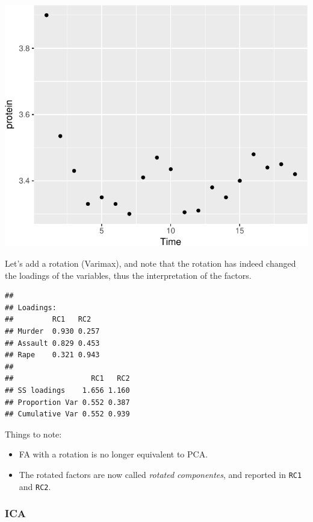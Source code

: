 \documentclass[]{book}
\newenvironment{Shaded}{\begin{snugshade}}{\end{snugshade}}
\newcommand{\DataTypeTok}[1]{\textcolor[rgb]{0.13,0.29,0.53}{#1}}
\newcommand{\DecValTok}[1]{\textcolor[rgb]{0.00,0.00,0.81}{#1}}
\newcommand{\FloatTok}[1]{\textcolor[rgb]{0.00,0.00,0.81}{#1}}
\newcommand{\KeywordTok}[1]{\textcolor[rgb]{0.13,0.29,0.53}{\textbf{#1}}}
\newcommand{\NormalTok}[1]{#1}
\newcommand{\OperatorTok}[1]{\textcolor[rgb]{0.81,0.36,0.00}{\textbf{#1}}}
\newcommand{\StringTok}[1]{\textcolor[rgb]{0.31,0.60,0.02}{#1}}
\providecommand{\tightlist}{%
  \setlength{\itemsep}{0pt}\setlength{\parskip}{0pt}}
\theoremstyle{definition}
\theoremstyle{definition}
\theoremstyle{definition}
\theoremstyle{remark}
\begin{document}
\includegraphics[width=0.5\linewidth]{Rcourse_files/figure-latex/unnamed-chunk-243-1}

Let's add a rotation (Varimax), and note that the rotation has indeed changed the loadings of the variables, thus the interpretation of the factors.

\begin{Shaded}
\end{Shaded}

\begin{verbatim}
## 
## Loadings:
##         RC1   RC2  
## Murder  0.930 0.257
## Assault 0.829 0.453
## Rape    0.321 0.943
## 
##                  RC1   RC2
## SS loadings    1.656 1.160
## Proportion Var 0.552 0.387
## Cumulative Var 0.552 0.939
\end{verbatim}

Things to note:

\begin{itemize}
\tightlist
\item
  FA with a rotation is no longer equivalent to PCA.
\item
  The rotated factors are now called \emph{rotated componentes}, and reported in \texttt{RC1} and \texttt{RC2}.
\end{itemize}

\hypertarget{ica}{%
\subsubsection{ICA}\label{ica}}
\end{document}
